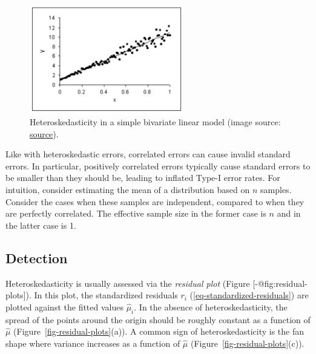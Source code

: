 \documentclass[
  11pt,
  letterpaper,
  oneside]{book}
\theoremstyle{definition}
\theoremstyle{plain}
\theoremstyle{plain}
\theoremstyle{plain}
\theoremstyle{remark}
\begin{document}
\begin{figure}

{\centering \includegraphics[width=0.6\textwidth,height=\textheight]{figures/heteroskedasticity.png}

}

\caption{\label{fig-heteroskedasticity}Heteroskedasticity in a simple
bivariate linear model (image source:
\href{http://www3.wabash.edu/econometrics/EconometricsBook/chap19.htm}{source}).}

\end{figure}

Like with heteroskedastic errors, correlated errors can cause invalid
standard errors. In particular, positively correlated errors typically
cause standard errors to be smaller than they should be, leading to
inflated Type-I error rates. For intuition, consider estimating the mean
of a distribution based on \(n\) samples. Consider the cases when these
samples are independent, compared to when they are perfectly correlated.
The effective sample size in the former case is \(n\) and in the latter
case is 1.

\hypertarget{detection-1}{%
\subsection{Detection}\label{detection-1}}

Heteroskedasticity is usually assessed via the \emph{residual plot}
(Figure {[}-@fig:residual-plots{]}). In this plot, the standardized
residuals \(r_i\) (\ref{eq-standardized-residuals}) are plotted against
the fitted values \(\widehat{\mu}_i\). In the absence of
heteroskedasticity, the spread of the points around the origin should be
roughly constant as a function of \(\widehat{\mu}\)
(Figure~\ref{fig-residual-plots}(a)). A common sign of
heteroskedasticity is the fan shape where variance increases as a
function of \(\widehat{\mu}\) (Figure~\ref{fig-residual-plots}(c)).
\end{document}
